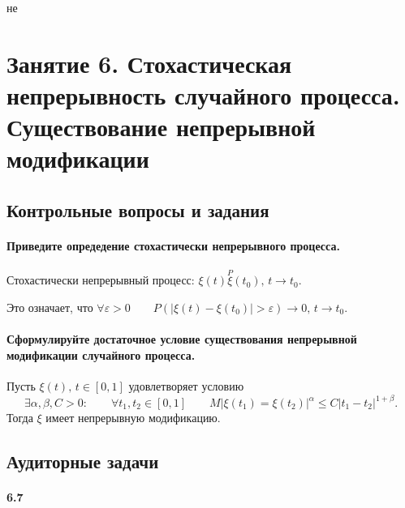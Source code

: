 не 
\chapter*{Занятие 6. Стохастическая непрерывность случайного процесса.
          Существование непрерывной модификации}

\section*{Контрольные вопросы и задания}

\subsubsection*{Приведите опредедение стохастически непрерывного процесса.}

Стохастически непрерывный процесс:
$ \xi \left( t \right) \overset{P} \xi \left( t_0 \right), \, t \to t_0$.

Это означает, что
$ \forall \varepsilon > 0 \qquad
  P \left( \left| \xi \left( t \right) - \xi \left( t_0 \right) \right| > \varepsilon \right) \to 0,
  \, t \to t_0$.

\subsubsection*{Сформулируйте достаточное условие существования непрерывной модификации случайного
                процесса.}

Пусть $ \xi \left( t \right), \, t \in \left[ 0, 1 \right] $ удовлетворяет условию
$$ \exists \alpha, \beta, C > 0: \qquad
  \forall t_1, t_2 \in \left[ 0, 1 \right] \qquad
  M \left| \xi \left( t_1 \right) =
  \xi \left( t_2 \right) \right|^{ \alpha } \leq C \left| t_1 - t_2 \right|^{1 + \beta }.$$
Тогда $ \xi $ имеет непрерывную модификацию.

\section*{Аудиторные задачи}

\subsubsection*{6.7}

